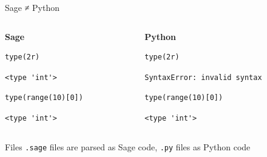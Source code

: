 \documentclass[presentation,smaller]{beamer}
\begin{document}
\begin{frame}[fragile,label={sec:orgdb3fa6b}]{Sage ≠ Python}
 \begin{columns}[t]
\begin{column}{0.45\columnwidth}
\textbf{Sage}

\lstset{language=sage,label= ,caption= ,captionpos=b,numbers=none}
\begin{lstlisting}
type(2r)
\end{lstlisting}

\begin{verbatim}
<type 'int'>
\end{verbatim}

\lstset{language=sage,label= ,caption= ,captionpos=b,numbers=none}
\begin{lstlisting}
type(range(10)[0])
\end{lstlisting}

\begin{verbatim}
<type 'int'>
\end{verbatim}
\end{column}

\begin{column}{0.45\columnwidth}
\textbf{Python}

\lstset{language=Python,label= ,caption= ,captionpos=b,numbers=none}
\begin{lstlisting}
type(2r)
\end{lstlisting}

\begin{verbatim}
SyntaxError: invalid syntax
\end{verbatim}

\lstset{language=Python,label= ,caption= ,captionpos=b,numbers=none}
\begin{lstlisting}
type(range(10)[0])
\end{lstlisting}

\begin{verbatim}
<type 'int'>
\end{verbatim}
\end{column}
\end{columns}


\begin{block}{Files}
\texttt{.sage} files are parsed as Sage code, \texttt{.py} files as Python code
\end{block}
\end{frame}
\end{document}
